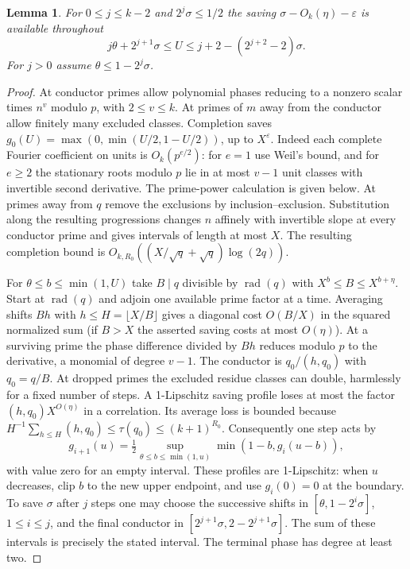 \documentclass[11pt,letterpaper]{article}
\newtheorem{lemma}[lemma]{Lemma}
\theoremstyle{definition}
\newcommand{\eps}{\varepsilon}
\DeclareMathOperator{\rad}{rad}
\begin{document}
\begin{lemma}\label{lem:diffcells}
For $0\le j\le k-2$ and $2^j\sigma\le1/2$ the saving
$\sigma-O_k(\eta)-\eps$ is available throughout
\[
 j\theta+2^{j+1}\sigma\le U\le j+2-(2^{j+2}-2)\sigma .
\]
For $j>0$ assume $\theta\le1-2^j\sigma$.
\end{lemma}
\begin{proof}
At conductor primes allow polynomial phases reducing to a nonzero scalar
times $n^v$ modulo $p$, with $2\le v\le k$. At primes of $m$ away
from the conductor allow finitely many excluded classes. Completion
saves $g_0(U)=\max(0,\min(U/2,1-U/2))$, up to $X^\eps$. Indeed each
complete Fourier coefficient on units is $O_k(p^{e/2})$: for $e=1$
use Weil's bound, and for $e\ge2$ the stationary roots modulo $p$
lie in at most $v-1$ unit classes with invertible second derivative.
The prime-power calculation is given below. At primes away from $q$
remove the exclusions by inclusion--exclusion. Substitution along the
resulting progressions changes $n$ affinely with invertible slope at
every conductor prime and gives intervals of length at most $X$.
The resulting completion bound is $O_{k,R_0}((X/\sqrt q+\sqrt q)\log(2q))$.

For $\theta\le b\le\min(1,U)$ take $B\mid q$ divisible by
$\rad(q)$ with $X^b\le B\le X^{b+\eta}$. Start at $\rad(q)$ and
adjoin one available prime factor at a time. Averaging shifts $Bh$ with
$h\le H=\lfloor X/B\rfloor$ gives a diagonal cost $O(B/X)$ in the
squared normalized sum (if $B>X$ the asserted saving costs at most
$O(\eta)$). At a surviving prime the phase difference divided by $Bh$
reduces modulo $p$ to the derivative, a monomial of degree $v-1$.
The conductor is $q_0/(h,q_0)$ with $q_0=q/B$. At dropped primes
the excluded residue classes can double, harmlessly for a fixed
number of steps. A 1-Lipschitz saving profile loses at most the
factor $(h,q_0)X^{O(\eta)}$ in a correlation. Its average loss is bounded
because $H^{-1}\sum_{h\le H}(h,q_0)\le\tau(q_0)\le(k+1)^{R_0}$.
Consequently one step acts by
\[
 g_{i+1}(u)=\tfrac12\sup_{\theta\le b\le\min(1,u)}
             \min(1-b,g_i(u-b)),
\]
with value zero for an empty interval. These profiles are 1-Lipschitz:
when $u$ decreases, clip $b$ to the new upper endpoint, and use
$g_i(0)=0$ at the boundary. To save $\sigma$ after $j$ steps one may
choose the successive shifts in
$[\theta,1-2^i\sigma]$, $1\le i\le j$, and the final
conductor in $[2^{j+1}\sigma,2-2^{j+1}\sigma]$. The sum of these
intervals is precisely the stated interval. The terminal phase has
degree at least two.
\end{proof}
\end{document}

